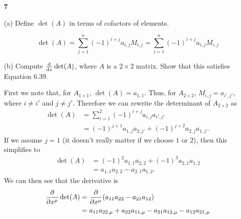 \documentclass[gr-notes.tex]{subfiles}
\begin{document}
\textbf{7}

(a) Define $\det(A)$ in terms of cofactors of elements.

\begin{displaymath}
  \det(A) =
  \sum_{j=1}^n (-1)^{i+j} a_{i,j} M_{i,j} =
  \sum_{i=1}^n (-1)^{i+j} a_{i,j} M_{i,j}
\end{displaymath}

(b) Compute $\dv{x} \det(A)$, where $A$ is a $2\times2$ matrix. Show that this satisfies Equation 6.39.

First we note that, for $A_{1\times1}$, $\det(A) = a_{1,1}$. Thus, for $A_{2\times2}$, $M_{i,j} = a_{i',j'}$, where $i \neq i'$ and $j \neq j'$. Therefore we can rewrite the determinant of $A_{2\times2}$ as
%
\begin{align*}
  \det(A) &=
  \sum_{i=1}^2 (-1)^{i+j} a_{i,j} a_{i',j'}
  \\ &=
  (-1)^{j+1} a_{1,j} a_{2,j'} + (-1)^{j+2} a_{2,j} a_{1,j'}.
\end{align*}
%
If we assume $j = 1$ (it doesn't really matter if we choose $1$ or $2$), then this simplifies to
%
\begin{align*}
  \det(A) &=
  (-1)^2 a_{1,1} a_{2,2} + (-1)^3 a_{2,1} a_{1,2}
  \\ &=
  a_{1,1} a_{2,2} - a_{2,1} a_{1,2}.
\end{align*}
%
We can then see that the derivative is
%
\begin{align*}
  \pdv{x^\mu} \det(A) &=
  \pdv{x^\mu} (a_{11} a_{22} - a_{21} a_{12})
  \\ &=
  a_{11} a_{22,\mu} + a_{22} a_{11,\mu} - a_{21} a_{12,\mu} - a_{12} a_{21,\mu}
\end{align*}
\end{document}
